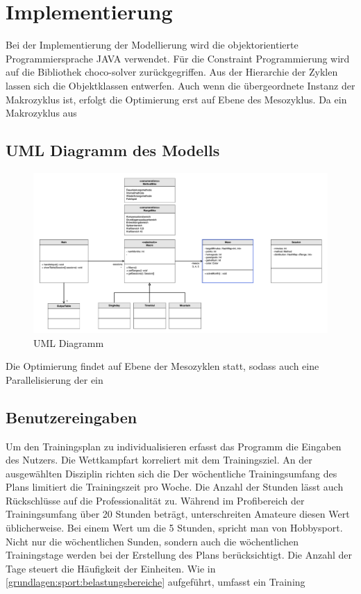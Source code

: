 \chapter{Implementierung}
\label{sec:implementierung} 
Bei der Implementierung der Modellierung wird die objektorientierte Programmiersprache JAVA \cite{java} verwendet. Für die Constraint Programmierung wird auf die Bibliothek choco-solver \cite{ChocoSolverWeb} zurückgegriffen. Aus der Hierarchie der Zyklen lassen sich die Objektklassen entwerfen. Auch wenn die übergeordnete Instanz der Makrozyklus ist, erfolgt die Optimierung erst auf Ebene des Mesozyklus. Da ein Makrozyklus aus  

\section{UML Diagramm des Modells}
\label{sec:design:UML}
\begin{figure}[htb]
	\includegraphics[width=\textwidth]{gfx/uml.png}
	\caption{UML Diagramm}
	\label{fig:system:example1}
\end{figure}

Die Optimierung findet auf Ebene der Mesozyklen statt, sodass auch eine Parallelisierung der ein
\section{Benutzereingaben}
Um den Trainingsplan zu individualisieren erfasst das Programm die Eingaben des Nutzers. \newline
Die Wettkampfart korreliert mit dem Trainingsziel. An der ausgewählten Disziplin richten sich die \newline
Der wöchentliche Trainingsumfang des Plans limitiert die Trainingszeit pro Woche. Die Anzahl der Stunden lässt auch Rückschlüsse auf die Professionalität zu. Während im Profibereich der Trainingsumfang über 20 Stunden beträgt, unterschreiten Amateure diesen Wert üblicherweise. Bei einem Wert um die 5 Stunden, spricht man von Hobbysport. \newline
Nicht nur die wöchentlichen Sunden, sondern auch die wöchentlichen Trainingstage werden bei der Erstellung des Plans berücksichtigt. Die Anzahl der Tage steuert die Häufigkeit der Einheiten.
Wie in \ref{grundlagen:sport:belastungsbereiche} aufgeführt, umfasst ein Training 

